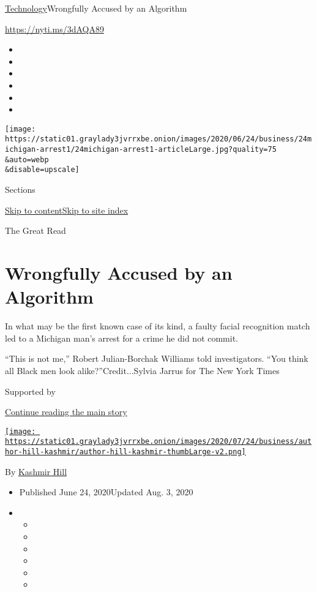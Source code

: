 \href{/section/technology}{Technology}\textbar{}Wrongfully Accused by an
Algorithm

\href{https://nyti.ms/3dAQA89}{https://nyti.ms/3dAQA89}

\begin{itemize}
\item
\item
\item
\item
\item
\item
\end{itemize}

\texttt{[image: https://static01.graylady3jvrrxbe.onion/images/2020/06/24/business/24michigan-arrest1/24michigan-arrest1-articleLarge.jpg?quality=75\\\&auto=webp\\\&disable=upscale]}

Sections

\protect\hyperlink{site-content}{Skip to
content}\protect\hyperlink{site-index}{Skip to site index}

The Great Read

\hypertarget{wrongfully-accused-by-an-algorithm}{%
\section{Wrongfully Accused by an
Algorithm}\label{wrongfully-accused-by-an-algorithm}}

In what may be the first known case of its kind, a faulty facial
recognition match led to a Michigan man's arrest for a crime he did not
commit.

``This is not me,'' Robert Julian-Borchak Williams told investigators.
``You think all Black men look alike?''Credit...Sylvia Jarrus for The
New York Times

Supported by

\protect\hyperlink{after-sponsor}{Continue reading the main story}

\href{https://www.nytimes3xbfgragh.onion/by/kashmir-hill}{\texttt{[image: https://static01.graylady3jvrrxbe.onion/images/2020/07/24/business/author-hill-kashmir/author-hill-kashmir-thumbLarge-v2.png]}}

By \href{https://www.nytimes3xbfgragh.onion/by/kashmir-hill}{Kashmir
Hill}

\begin{itemize}
\item
  Published June 24, 2020Updated Aug. 3, 2020
\item
  \begin{itemize}
  \item
  \item
  \item
  \item
  \item
  \item
  \end{itemize}
\end{itemize}

